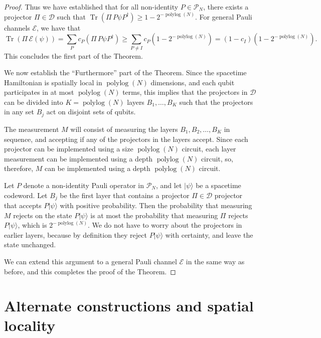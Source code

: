 \documentclass[11pt,letterpaper]{article}
\theoremstyle{definition}
\theoremstyle{remark}
\newcommand{\Paren}[1]{\left(#1\right)}
\DeclareMathOperator{\Tr}{Tr}
\DeclareMathOperator{\polylog}{polylog}
\newcommand{\cD}{\mathcal D}
\newcommand{\cE}{\mathcal E}
\newcommand{\cP}{\mathcal P}
\renewcommand{\geq}{\geqslant}
\numberwithin{equation}{section}
\theoremstyle{definition}
\newcommand{\ket}[1]{|#1\rangle}
\begin{document}
\begin{proof}
  Thus we have established that for all non-identity $P \in \cP_N$, there exists a projector $\Pi \in \cD$ such that $\Tr(\Pi \, P \psi P^\dagger) \geq 1 - 2^{-\polylog(N)}$. For general Pauli channels $\cE$, we have that
  \begin{equation}
    \Tr \Paren{ \Pi \, \cE(\psi) } = \sum_P c_P \Paren{ \Pi \, P \psi P^\dagger} \geq \sum_{P \neq I} c_P (1 - 2^{-\polylog(N)}) = (1 - c_I)(1 - 2^{-\polylog(N)}).
  \end{equation}
  This concludes the first part of the Theorem.
  
  We now establish the ``Furthermore'' part of the Theorem. Since the spacetime Hamiltonian is spatially local in $\polylog(N)$ dimensions, and each qubit participates in at most $\polylog(N)$ terms, this implies that the projectors in $\cD$ can be divided into $K = \polylog(N)$ layers $B_1,\ldots,B_K$ such that the projectors in any set $B_j$ act on disjoint sets of qubits. %
  
  The measurement $M$ will consist of measuring the layers $B_1,B_2,\ldots,B_K$ in sequence, and accepting if any of the projectors in the layers accept. Since each projector can be implemented using a size $\polylog(N)$ circuit, each layer measurement can be implemented using a depth $\polylog(N)$ circuit, so, therefore, $M$ can be implemented using a depth $\polylog(N)$ circuit. 
  
  Let $P$ denote a non-identity Pauli operator in $\cP_N$, and let $\ket{\psi}$ be a spacetime codeword. Let $B_j$ be the first layer that contains a projector $\Pi \in \cD$ projector that accepts $P \ket{\psi}$ with positive probability. Then the probability that measuring $M$ rejects on the state $P \ket{\psi}$ is at most the probability that measuring $\Pi$ rejects $P \ket{\psi}$, which is $2^{-\polylog(N)}$. We do not have to worry about the projectors in earlier layers, because by definition they reject $P \ket{\psi}$ with certainty, and leave the state unchanged.
  
  We can extend this argument to a general Pauli channel $\cE$ in the same way as before, and this completes the proof of the Theorem.
\end{proof}


%

\section{Alternate constructions and spatial locality}
\end{document}
